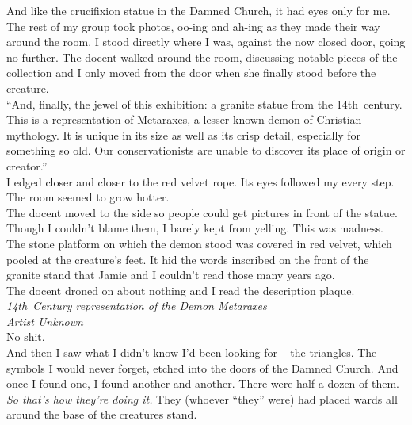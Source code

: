 \documentclass[a5paper]{scrartcl}
\begin{document}
And like the crucifixion statue in the Damned Church, it had eyes only for me.\\


The rest of my group took photos, oo-ing and ah-ing as they made their way around the room. I stood directly where I was, against the now closed door, going no further. The docent walked around the room, discussing notable pieces of the collection and I only moved from the door when she finally stood before the creature.\\


\enquote{And, finally, the jewel of this exhibition: a granite statue from the 14th~century. This is a representation of Metaraxes, a lesser known demon of Christian mythology. It is unique in its size as well as its crisp detail, especially for something so old. Our conservationists are unable to discover its place of origin or creator.}\\


I edged closer and closer to the red velvet rope. Its eyes followed my every step. The room seemed to grow hotter. \\


The docent moved to the side so people could get pictures in front of the statue. Though I couldn't blame them, I barely kept from yelling. This was madness.\\


The stone platform on which the demon stood was covered in red velvet, which pooled at the creature's feet. It hid the words inscribed on the front of the granite stand that Jamie and I couldn't read those many years ago.\\


The docent droned on about nothing and I read the description plaque.\\


\textit{14th~Century representation of the Demon Metaraxes}
\\


\textit{Artist Unknown}
\\


No shit.\\


And then I saw what I didn't know I'd been looking for -- the triangles. The symbols I would never forget, etched into the doors of the Damned Church. And once I found one, I found another and another. There were half a dozen of them. \textit{So that's how they're doing it.}
 They (whoever \enquote{they} were) had placed wards all around the base of the creatures stand. \\
\end{document}

